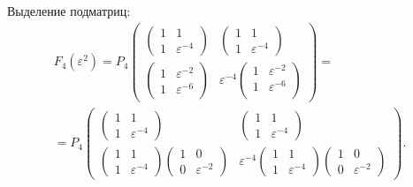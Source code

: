 Выделение подматриц:
\begin{multline*}
    F_4(\varepsilon^2)
    =
    P_4
    \begin{pmatrix}
        \begin{pmatrix}
            1 & 1                \\
            1 & \varepsilon^{-4}
        \end{pmatrix}
         &
        \begin{pmatrix}
            1 & 1                \\
            1 & \varepsilon^{-4}
        \end{pmatrix}
        \\
        \begin{pmatrix}
            1 & \varepsilon^{-2} \\
            1 & \varepsilon^{-6}
        \end{pmatrix}
         &
        \varepsilon^{-4}
        \begin{pmatrix}
            1 & \varepsilon^{-2} \\
            1 & \varepsilon^{-6} \\
        \end{pmatrix}
    \end{pmatrix} = \\
    = P_4
    \begin{pmatrix}
        \begin{pmatrix}
            1 & 1                \\
            1 & \varepsilon^{-4}
        \end{pmatrix}
         &
        \begin{pmatrix}
            1 & 1                \\
            1 & \varepsilon^{-4}
        \end{pmatrix}
        \\
        \begin{pmatrix}
            1 & 1                \\
            1 & \varepsilon^{-4}
        \end{pmatrix}
        \begin{pmatrix}
            1 & 0                \\
            0 & \varepsilon^{-2}
        \end{pmatrix}
         &
        \varepsilon^{-4}
        \begin{pmatrix}
            1 & 1                \\
            1 & \varepsilon^{-4}
        \end{pmatrix}
        \begin{pmatrix}
            1 & 0                \\
            0 & \varepsilon^{-2}
        \end{pmatrix}
    \end{pmatrix} .
\end{multline*}

